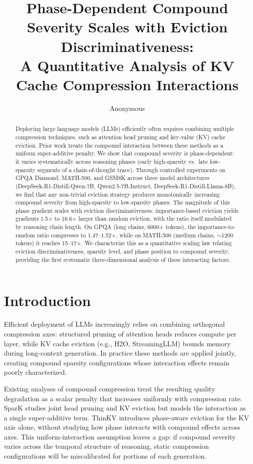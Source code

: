 \documentclass[11pt,a4paper]{article}
\title{Phase-Dependent Compound Severity Scales with Eviction Discriminativeness: \\A Quantitative Analysis of KV Cache Compression Interactions}
\author{Anonymous}
\date{}
\begin{document}
\maketitle

\begin{abstract}
Deploying large language models (LLMs) efficiently often requires combining multiple compression techniques, such as attention head pruning and key-value (KV) cache eviction. Prior work treats the compound interaction between these methods as a uniform super-additive penalty. We show that compound severity is phase-dependent: it varies systematically across reasoning phases (early high-sparsity vs.\ late low-sparsity segments of a chain-of-thought trace). Through controlled experiments on GPQA Diamond, MATH-500, and GSM8K across three model architectures (DeepSeek-R1-Distill-Qwen-7B, Qwen2.5-7B-Instruct, DeepSeek-R1-Distill-Llama-8B), we find that any non-trivial eviction strategy produces monotonically increasing compound severity from high-sparsity to low-sparsity phases. The magnitude of this phase gradient scales with eviction discriminativeness: importance-based eviction yields gradients 1.5$\times$ to 16.6$\times$ larger than random eviction, with the ratio itself modulated by reasoning chain length. On GPQA (long chains, 6000+ tokens), the importance-to-random ratio compresses to 1.47--1.52$\times$, while on MATH-500 (medium chains, $\sim$1200 tokens) it reaches 15--17$\times$. We characterize this as a quantitative scaling law relating eviction discriminativeness, sparsity level, and phase position to compound severity, providing the first systematic three-dimensional analysis of these interacting factors.
\end{abstract}

\section{Introduction}

Efficient deployment of LLMs increasingly relies on combining orthogonal compression axes: structured pruning of attention heads reduces compute per layer, while KV cache eviction (e.g., H2O, StreamingLLM) bounds memory during long-context generation. In practice these methods are applied jointly, creating compound sparsity configurations whose interaction effects remain poorly characterized.

Existing analyses of compound compression treat the resulting quality degradation as a scalar penalty that increases uniformly with compression rate. SparK studies joint head pruning and KV eviction but models the interaction as a single super-additive term. ThinKV introduces phase-aware eviction for the KV axis alone, without studying how phase interacts with compound effects across axes. This uniform-interaction assumption leaves a gap: if compound severity varies across the temporal structure of reasoning, static compression configurations will be miscalibrated for portions of each generation.
\end{document}
